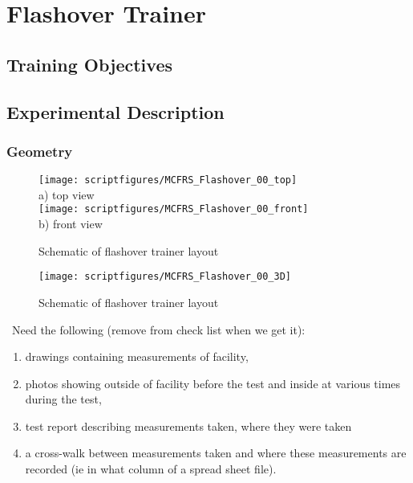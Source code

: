 \chapter{Flashover Trainer}

\section{Training Objectives}

\section{Experimental Description}
\subsection{Geometry}

\begin{figure}[\figoptions]
\begin{center}
\texttt{[image: scriptfigures/MCFRS\_Flashover\_00\_top]}\\
a) top view\\
\texttt{[image: scriptfigures/MCFRS\_Flashover\_00\_front]}\\
b) front view\\
\end{center}
\caption {Schematic of flashover trainer layout}
\label{figflashoverplan}%
\end{figure}

\begin{figure}[\figoptions]
\begin{center}
\texttt{[image: scriptfigures/MCFRS\_Flashover\_00\_3D]}\\
\end{center}
\caption {Schematic of flashover trainer layout}
\label{figflashoverplan}%
\end{figure}

\note\ Need the following (remove from check list when we get it):
\begin{enumerate}
\item drawings containing measurements of facility,
\item photos showing outside of facility before the test and inside at various times during the test,
\item test report describing
measurements taken, where they were taken
\item a cross-walk between measurements taken and where these measurements are recorded (ie
in what column of a spread sheet file).
\end{enumerate}

